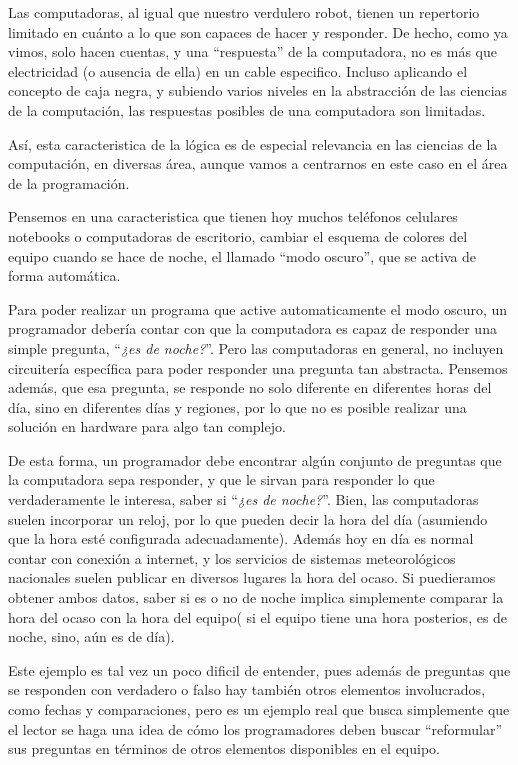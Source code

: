 Las computadoras, al igual que nuestro verdulero robot, tienen un repertorio
limitado en cuánto a lo que son capaces de hacer y responder. De hecho, como ya
vimos, solo hacen cuentas, y una ``respuesta'' de la computadora, no es más que
electricidad (o ausencia de ella) en un cable especifico. Incluso aplicando el
concepto de caja negra, y subiendo varios niveles en la abstracción de las
ciencias de la computación, las respuestas posibles de una computadora son
limitadas.

Así, esta caracteristica de la lógica es de especial relevancia en las ciencias
de la computación, en diversas área, aunque vamos a centrarnos en este caso en
el área de la programación.

Pensemos en una caracteristica que tienen hoy muchos teléfonos celulares
notebooks o computadoras de escritorio, cambiar el esquema de colores del equipo
cuando se hace de noche, el llamado ``modo oscuro'', que se activa de forma
automática.

Para poder realizar un programa que active automaticamente el modo oscuro, un
programador debería contar con que la computadora es capaz de responder una
simple pregunta, ``\textit{¿es de noche?}''. Pero las computadoras en general,
no incluyen circuitería específica para poder responder una pregunta tan
abstracta. Pensemos además, que esa pregunta, se responde no solo diferente en
diferentes horas del día, sino en diferentes días y regiones, por lo que no es
posible realizar una solución en hardware para algo tan complejo.

De esta forma, un programador debe encontrar algún conjunto de preguntas que la
computadora sepa responder, y que le sirvan para responder lo que verdaderamente
le interesa, saber si ``\textit{¿es de noche?}''. Bien, las computadoras suelen
incorporar un reloj, por lo que pueden decir la hora del día (asumiendo que la
hora esté configurada adecuadamente). Además hoy en día es normal contar con
conexión a internet, y los servicios de sistemas meteorológicos nacionales
suelen publicar en diversos lugares la hora del ocaso. Si puedieramos obtener
ambos datos, saber si es o no de noche implica simplemente comparar la hora del
ocaso con la hora del equipo( si el equipo tiene una hora posterios, es de
noche, sino, aún es de día).

Este ejemplo es tal vez un poco dificil de entender, pues además de preguntas
que se responden con verdadero o falso hay también otros elementos involucrados,
como fechas y comparaciones, pero es un ejemplo real que busca simplemente que
el lector se haga una idea de cómo los programadores deben buscar ``reformular''
sus preguntas en términos de otros elementos disponibles en el equipo.

